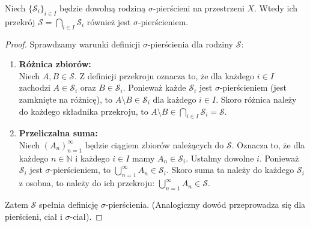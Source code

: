 \begin{theorem}
    Niech $\{\mathcal{S}_i\}_{i \in I}$ będzie dowolną rodziną $\sigma$-pierścieni na przestrzeni $X$. Wtedy ich przekrój $\mathcal{S} = \bigcap_{i \in I} \mathcal{S}_i$ również jest $\sigma$-pierścieniem.
\end{theorem}

\begin{proof}
    Sprawdzamy warunki definicji $\sigma$-pierścienia dla rodziny $\mathcal{S}$:
    \begin{enumerate}
        \item \textbf{Różnica zbiorów:} \\
        Niech $A, B \in \mathcal{S}$. Z definicji przekroju oznacza to, że dla każdego $i \in I$ zachodzi $A \in \mathcal{S}_i$ oraz $B \in \mathcal{S}_i$.
        Ponieważ każde $\mathcal{S}_i$ jest $\sigma$-pierścieniem (jest zamknięte na różnicę), to $A \setminus B \in \mathcal{S}_i$ dla każdego $i \in I$.
        Skoro różnica należy do każdego składnika przekroju, to $A \setminus B \in \bigcap_{i \in I} \mathcal{S}_i = \mathcal{S}$.

        \item \textbf{Przeliczalna suma:} \\
        Niech $(A_n)_{n=1}^\infty$ będzie ciągiem zbiorów należących do $\mathcal{S}$.
        Oznacza to, że dla każdego $n \in \mathbb{N}$ i każdego $i \in I$ mamy $A_n \in \mathcal{S}_i$.
        Ustalmy dowolne $i$. Ponieważ $\mathcal{S}_i$ jest $\sigma$-pierścieniem, to $\bigcup_{n=1}^\infty A_n \in \mathcal{S}_i$.
        Skoro suma ta należy do każdego $\mathcal{S}_i$ z osobna, to należy do ich przekroju: $\bigcup_{n=1}^\infty A_n \in \mathcal{S}$.
    \end{enumerate}
    Zatem $\mathcal{S}$ spełnia definicję $\sigma$-pierścienia.
    (Analogiczny dowód przeprowadza się dla pierścieni, ciał i $\sigma$-ciał).
\end{proof}


